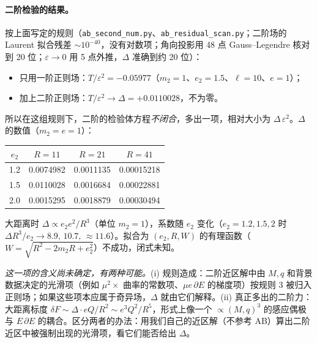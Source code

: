 \documentclass[11pt,a4paper]{ctexart}
\numberwithin{equation}{section}
\begin{document}
\paragraph{二阶检验的结果。}按上面写定的规则（\texttt{ab\_second\_num.py}、\texttt{ab\_residual\_scan.py}；二阶场的 Laurent 拟合残差 $\sim10^{-40}$，没有对数项；角向投影用 48 点 Gauss--Legendre 核对到 20 位；$\varepsilon\to0$ 用 5 点外推，$\Delta$ 准确到约 20 位）：
\begin{itemize}
\item 只用一阶正则场：$T/\varepsilon^2=-0.05977$（$m_2=1$、$e_2=1.5$、$\ell=10$、$e=1$）；
\item 加上二阶正则场：$T/\varepsilon^2\to\Delta=+0.0110028$，不为零。
\end{itemize}
所以在这组规则下，二阶的检验体方程\emph{不闭合}，多出一项，相对大小为 $\Delta\,\varepsilon^2$。$\Delta$ 的数值（$m_2=e=1$）：
\begin{center}\small
\begin{tabular}{cccc}
\hline
$e_2$ & $R=11$ & $R=21$ & $R=41$\\
\hline
1.2 & 0.0074982 & 0.0011135 & 0.00015218\\
1.5 & 0.0110028 & 0.0016684 & 0.00022881\\
2.0 & 0.0015295 & 0.0018879 & 0.00030494\\
\hline
\end{tabular}
\end{center}
大距离时 $\Delta\propto e_2e^2/R^3$（单位 $m_2=1$），系数随 $e_2$ 变化（$e_2=1.2,1.5,2$ 时 $\Delta R^3/e_2\to8.9,\,10.7,\,\approx11.6$）。拟合为 $(e_2,R,W)$ 的有理函数（$W=\sqrt{R^2-2m_2R+e_2^2}$）不成功，闭式未知。

\emph{这一项的含义尚未确定，有两种可能。}(i) 规则造成：二阶近区解中由 $M,q$ 和背景数据决定的光滑项（例如 $\mu^2\times$ 曲率的常数项、$\mu e\,\partial E$ 的梯度项）按规则 3 被归入正则场；如果这些项本应属于奇异场，$\Delta$ 就由它们解释。(ii) 真正多出的二阶力：大距离标度 $\delta F\sim\Delta\cdot eQ/R^2\sim e^3Q^2/R^5$，形式上像一个 $\propto(M,q)^3$ 的感应偶极与 $E\,\partial E$ 的耦合。区分两者的办法：用我们自己的近区解（不参考 AB）算出二阶近区中被强制出现的光滑项，看它们能否给出 $\Delta$。
\end{document}
